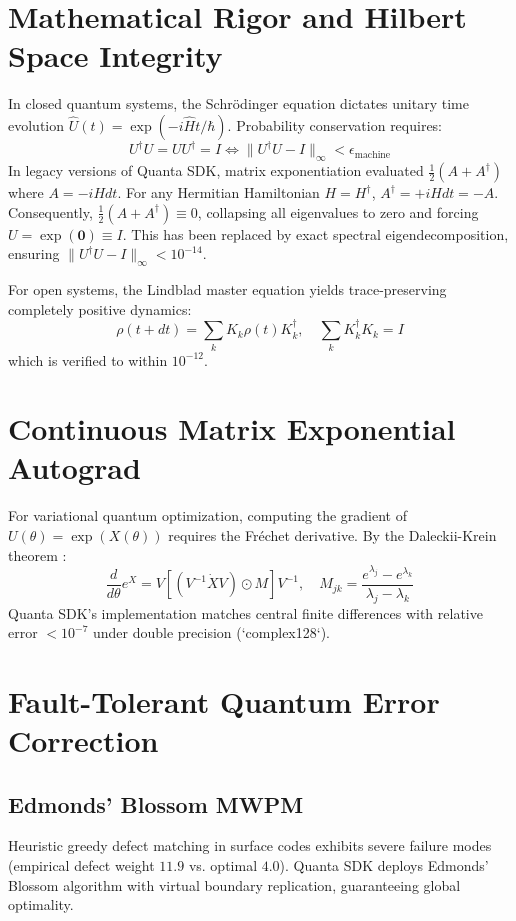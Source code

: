 \documentclass[aps,pra,reprint,superscriptaddress,amsmath,amssymb,floatfix]{revtex4-2}
\begin{document}
\section{Mathematical Rigor and Hilbert Space Integrity}
In closed quantum systems, the Schrödinger equation dictates unitary time evolution $\hat{U}(t) = \exp(-i \hat{H} t / \hbar)$. Probability conservation requires:
\begin{equation}
    U^\dagger U = U U^\dagger = I \iff \|U^\dagger U - I\|_\infty < \epsilon_{\text{machine}}
\end{equation}
In legacy versions of Quanta SDK, matrix exponentiation evaluated $\frac{1}{2}(A + A^\dagger)$ where $A = -i H dt$. For any Hermitian Hamiltonian $H = H^\dagger$, $A^\dagger = +i H dt = -A$. Consequently, $\frac{1}{2}(A + A^\dagger) \equiv 0$, collapsing all eigenvalues to zero and forcing $U = \exp(\mathbf{0}) \equiv I$. This has been replaced by exact spectral eigendecomposition, ensuring $\|U^\dagger U - I\|_\infty < 10^{-14}$.

For open systems, the Lindblad master equation \cite{lindblad1976generators, gorini1976completely} yields trace-preserving completely positive dynamics:
\begin{equation}
    \rho(t + dt) = \sum_k K_k \rho(t) K_k^\dagger, \quad \sum_k K_k^\dagger K_k = I
\end{equation}
which is verified to within $10^{-12}$.

\section{Continuous Matrix Exponential Autograd}
For variational quantum optimization, computing the gradient of $U(\theta) = \exp(X(\theta))$ requires the Fréchet derivative. By the Daleckii-Krein theorem \cite{daleckii1974stability, mathias1996chain}:
\begin{equation}
    \frac{d}{d\theta} e^{X} = V \left[ (V^{-1} \dot{X} V) \odot M \right] V^{-1}, \quad M_{jk} = \frac{e^{\lambda_j} - e^{\lambda_k}}{\lambda_j - \lambda_k}
\end{equation}
Quanta SDK's implementation matches central finite differences with relative error $< 10^{-7}$ under double precision (`complex128`).

\section{Fault-Tolerant Quantum Error Correction}
\subsection{Edmonds' Blossom MWPM}
Heuristic greedy defect matching in surface codes exhibits severe failure modes (empirical defect weight $11.9$ vs. optimal $4.0$). Quanta SDK deploys Edmonds' Blossom algorithm \cite{edmonds1965paths, kolmogorov2009blossom} with virtual boundary replication, guaranteeing global optimality.
\end{document}

